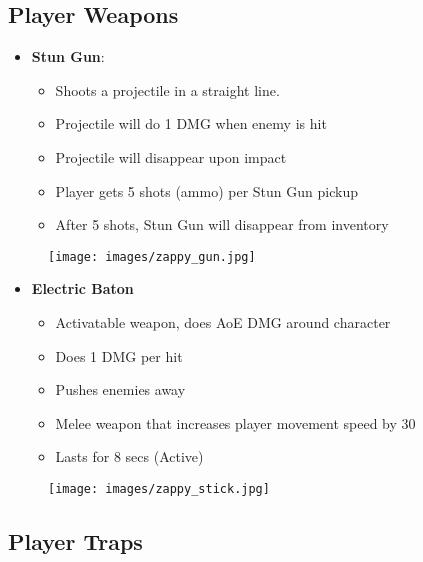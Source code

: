 \documentclass[11pt]{report}
\begin{document}
\subsection{Player Weapons}


\begin{itemize}
    \item \textbf{Stun Gun}:
    \begin{itemize}
        \item Shoots a projectile in a straight line.
        \item Projectile will do 1 DMG when enemy is hit 
        \item Projectile will disappear upon impact
        \item Player gets 5 shots (ammo) per Stun Gun pickup
        \item After 5 shots, Stun Gun will disappear from inventory
    \end{itemize}
\end{itemize}

\begin{figure}[H]
    \centering
    \texttt{[image: images/zappy\_gun.jpg]}
    \caption{}
\end{figure}

\begin{itemize}
    \item \textbf{Electric Baton}
    \begin{itemize}
        \item Activatable weapon, does AoE DMG around character
        \item Does 1 DMG per hit
        \item Pushes enemies away
        \item Melee weapon that increases player movement speed by 30%
        \item Lasts for 8 secs (Active)
    \end{itemize}
\end{itemize}

\begin{figure}[H]
    \centering
    \texttt{[image: images/zappy\_stick.jpg]}
    \caption{}
\end{figure}
    
\subsection{Player Traps}
\end{document}
